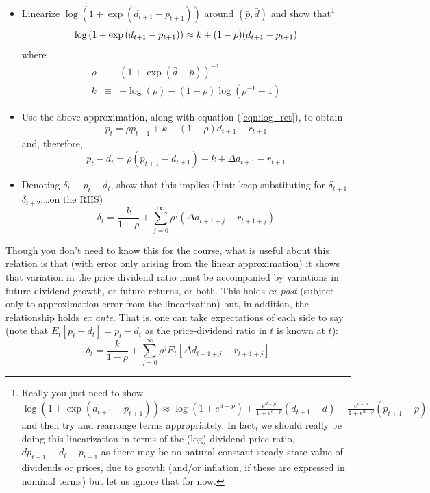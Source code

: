 \documentclass[authoryear,11pt]{elsarticle}
\begin{document}
\begin{itemize}
\item Linearize $\log{(1+ \exp{(d_{t+1} - p_{t+1})})}$ around $(\bar{p},\bar{d})$ and show that\footnote{Really you just need to show $\log{(1+ \exp{(d_{t+1} - p_{t+1})})} 	\approx 	\log{(1+e^{d-p})} +\frac{e^{d-p}}{1+e^{d-p}}(d_{t+1}-d) - \frac{e^{d-p}}{1+e^{d-p}}(p_{t+1}-p)$ and then try and rearrange terms appropriately. In fact, we should really be doing this linearization in terms of the (log) dividend-price ratio, $dp_{t+1}\equiv d_{t} - p_{t+1}$ as there may be no natural constant steady state value of dividends or prices, due to growth (and/or inflation, if these are expressed in nominal terms) but let us ignore that for now.}
\[
\log{(1+ \exp{(d_{t+1} - p_{t+1})})} 	\approx 	k + (1-\rho)(d_{t+1}-p_{t+1}) \\
\]
where
\begin{eqnarray*}
\rho		&\equiv&	(1+\exp{(\bar{d}-\bar{p})})^{-1} \\
k		&\equiv&	-\log{(\rho)} - (1-\rho)\log{(\rho^{-1} - 1)}
\end{eqnarray*}

\item Use the above approximation, along with equation (\ref{eqn:log_ret}), to obtain
\[
p_{t} = \rho p_{t+1} + k + (1-\rho)d_{t+1} - r_{t+1}
\]
and, therefore,
\[
p_{t}-d_{t} = \rho (p_{t+1}-d_{t+1}) + k + \Delta d_{t+1} - r_{t+1}
\]

\item Denoting $\delta_{t} \equiv p_{t}-d_{t}$, show that this implies (hint: keep substituting for $\delta_{t+1}$, $\delta_{t+2}$,\ldots on the RHS)
\begin{equation}
\delta_{t} = \frac{k}{1-\rho} + \sum\limits_{j=0}^{\infty} \rho^{j}(\Delta d_{t+1+j} - r_{t+1+j}) \label{eqn:expost}
\end{equation}
\end{itemize}

Though you don't need to know this for the course, what is useful about this relation is that (with error only arising from the linear approximation) it shows that variation in the price dividend ratio must be accompanied by variations in future dividend growth, or future returns, or both. This holds \emph{ex post} (subject only to approximation error from the linearization) but, in addition, the relationship holds \emph{ex ante}. That is, one can take expectations of each side to say (note that $E_{t}[p_{t} - d_{t}] = p_{t}-d_{t}$ as the price-dividend ratio in $t$ is known at $t$):
\[
\delta_{t} = \frac{k}{1-\rho} + \sum\limits_{j=0}^{\infty} \rho^{j}E_{t}[\Delta d_{t+1+j} - r_{t+1+j}]
\]
\end{document}
